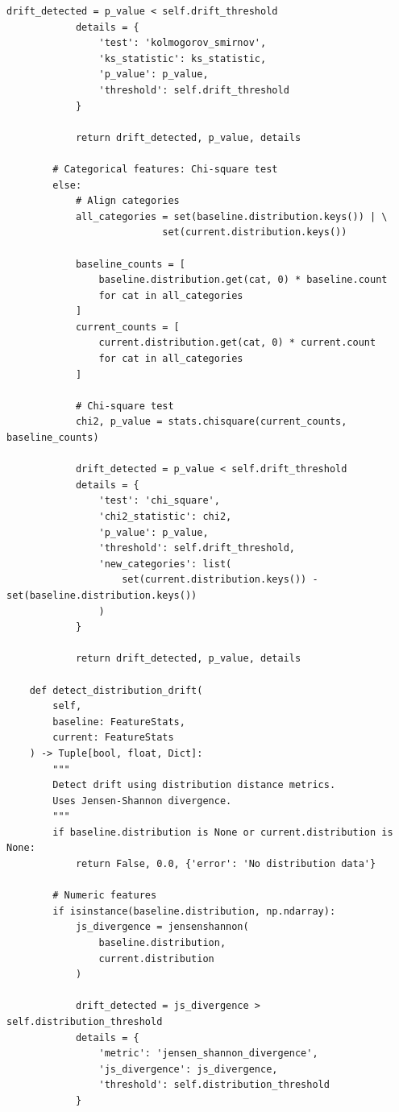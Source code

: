 \begin{lstlisting}[style=python, caption=Comprehensive feature monitoring and drift detection]
            drift_detected = p_value < self.drift_threshold
            details = {
                'test': 'kolmogorov_smirnov',
                'ks_statistic': ks_statistic,
                'p_value': p_value,
                'threshold': self.drift_threshold
            }

            return drift_detected, p_value, details

        # Categorical features: Chi-square test
        else:
            # Align categories
            all_categories = set(baseline.distribution.keys()) | \
                           set(current.distribution.keys())

            baseline_counts = [
                baseline.distribution.get(cat, 0) * baseline.count
                for cat in all_categories
            ]
            current_counts = [
                current.distribution.get(cat, 0) * current.count
                for cat in all_categories
            ]

            # Chi-square test
            chi2, p_value = stats.chisquare(current_counts, baseline_counts)

            drift_detected = p_value < self.drift_threshold
            details = {
                'test': 'chi_square',
                'chi2_statistic': chi2,
                'p_value': p_value,
                'threshold': self.drift_threshold,
                'new_categories': list(
                    set(current.distribution.keys()) - set(baseline.distribution.keys())
                )
            }

            return drift_detected, p_value, details

    def detect_distribution_drift(
        self,
        baseline: FeatureStats,
        current: FeatureStats
    ) -> Tuple[bool, float, Dict]:
        """
        Detect drift using distribution distance metrics.
        Uses Jensen-Shannon divergence.
        """
        if baseline.distribution is None or current.distribution is None:
            return False, 0.0, {'error': 'No distribution data'}

        # Numeric features
        if isinstance(baseline.distribution, np.ndarray):
            js_divergence = jensenshannon(
                baseline.distribution,
                current.distribution
            )

            drift_detected = js_divergence > self.distribution_threshold
            details = {
                'metric': 'jensen_shannon_divergence',
                'js_divergence': js_divergence,
                'threshold': self.distribution_threshold
            }


\end{lstlisting}
